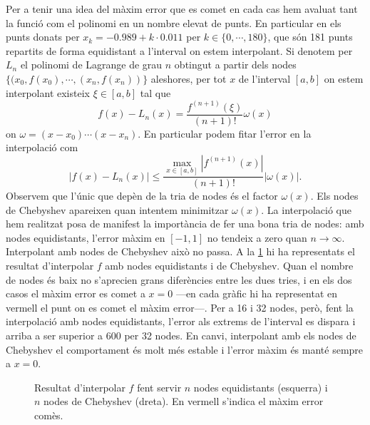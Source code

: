 \documentclass[12pt]{article}
\numberwithin{table}{section}
\numberwithin{figure}{section}
\numberwithin{equation}{section}
\newcommand{\abs}[1]{\left\lvert #1 \right\rvert}
\begin{document}
Per a tenir una idea del màxim error que es comet en cada cas hem avaluat tant la funció com el polinomi en un nombre elevat de punts. En particular en els punts donats per \( x_k = \num{-0.989} + k \cdot \num{0.011} \) per \( k \in \{0, \cdots, 180\} \), que són 181 punts repartits de forma equidistant a l'interval on estem interpolant. Si denotem per \( L_n \) el polinomi de Lagrange de grau \( n \) obtingut a partir dels nodes \( \{(x_0, f(x_0), \cdots , (x_n, f(x_n)) \} \) aleshores, per tot \( x \) de l'interval \( [a,b] \) on estem interpolant existeix \( \xi \in [a,b] \) tal que 
\begin{equation*}
	f(x) - L_n(x) = \frac{f^{(n+1)}(\xi)}{(n+1)!}\omega(x) 
\end{equation*}
on \( \omega = (x-x_0)\cdots(x-x_n) \). En particular podem fitar l'error en la interpolació com
\begin{equation*}
	\abs{f(x) - L_n(x)} \leq \frac{\max_{x \in [a,b]}\abs{f^{(n+1)}(x)}}{(n+1)!}\abs{\omega(x)}.
\end{equation*}
Observem que l'únic que depèn de la tria de nodes és el factor \( \omega(x) \). Els nodes de Chebyshev apareixen quan intentem minimitzar \( \omega(x) \). La interpolació que hem realitzat posa de manifest la importància de fer una bona tria de nodes: amb nodes equidistants, l'error màxim en \( [-1,1] \) no tendeix a zero quan \( n \to \infty \). Interpolant amb nodes de Chebyshev això no passa. A la \cref{fig:interpolacio} hi ha representats el resultat d'interpolar \( f \) amb nodes equidistants i de Chebyshev. Quan el nombre de nodes és baix no s'aprecien grans diferències entre les dues tries, i en els dos casos el màxim error es comet a \( x = 0 \) ---en cada gràfic hi ha representat en vermell el punt on es comet el màxim error---. Per a 16 i 32 nodes, però, fent la interpolació amb nodes equidistants, l'error als extrems de l'interval es dispara i arriba a ser superior a \( 600 \) per 32 nodes. En canvi, interpolant amb els nodes de Chebyshev el comportament és molt més estable i l'error màxim és manté sempre a \( x = 0 \). 

\begin{figure}[p]
	\centering
	\sffamily \footnotesize
	
	
	
	
	\caption{Resultat d'interpolar \( f \) fent servir \( n \) nodes equidistants (esquerra) i \( n \) nodes de Chebyshev (dreta). En vermell s'indica el màxim error comès.}
	\label{fig:interpolacio}
\end{figure}
\end{document}
